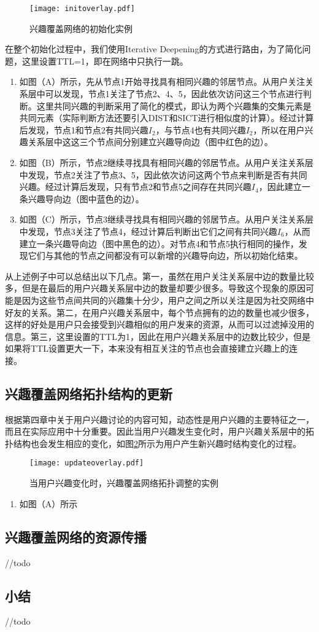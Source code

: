 \begin{figure}[!ht]
\centering
\texttt{[image: initoverlay.pdf]}
\caption{兴趣覆盖网络的初始化实例}
\label{fig:initoverlay}
\end{figure}

在整个初始化过程中，我们使用Iterative Deepening的方式进行路由，为了简化问题，这里设置TTL=1，即在网络中只执行一跳。
\begin{enumerate}
  \item 如图（A）所示，先从节点1开始寻找具有相同兴趣的邻居节点。从用户关注关系层中可以发现，节点1关注了节点2、4、5，因此依次访问这三个节点进行判断。这里共同兴趣的判断采用了简化的模式，即认为两个兴趣集的交集元素是共同元素（实际判断方法还要引入DIST和SICT进行相似度的计算）。经过计算后发现，节点1和节点2有共同兴趣$I_2$，与节点4也有共同兴趣$I_2$，所以在用户兴趣关系层中这这三个节点间分别建立兴趣导向边（图中红色的边）。
  \item 如图（B）所示，节点2继续寻找具有相同兴趣的邻居节点。从用户关注关系层中发现，节点2关注了节点3、5，因此依次访问这两个节点来判断是否有共同兴趣。经过计算后发现，只有节点2和节点5之间存在共同兴趣$I_4$，因此建立一条兴趣导向边（图中蓝色的边）。
  \item 如图（C）所示，节点3继续寻找具有相同兴趣的邻居节点。从用户关注关系层中发现，节点3关注了节点4，经过计算后判断出它们之间有共同兴趣$I_6$，从而建立一条兴趣导向边（图中黑色的边）。对节点4和节点5执行相同的操作，发现它们与其他的节点之间都没有可以新增的兴趣导向边，所以初始化结束。
\end{enumerate}

从上述例子中可以总结出以下几点。第一，虽然在用户关注关系层中边的数量比较多，但是在最后的用户兴趣关系层中边的数量却要少很多。导致这个现象的原因可能是因为这些节点间共同的兴趣集十分少，用户之间之所以关注是因为社交网络中好友的关系。第二，在用户兴趣关系层中，每个节点拥有的边的数量也减少很多，这样的好处是用户只会接受到兴趣相似的用户发来的资源，从而可以过滤掉没用的信息。第三，这里设置的TTL为1，因此在用户兴趣关系层中的边数比较少，但是如果将TTL设置更大一下，本来没有相互关注的节点也会直接建立兴趣上的连接。

\subsection{兴趣覆盖网络拓扑结构的更新}
根据第四章中关于用户兴趣讨论的内容可知，动态性是用户兴趣的主要特征之一，而且在实际应用中十分重要。因此当用户兴趣发生变化时，用户兴趣关系层中的拓扑结构也会发生相应的变化，如图\ref{fig:updateoverlay}所示为用户产生新兴趣时结构变化的过程。

\begin{figure}[!ht]
\centering
\texttt{[image: updateoverlay.pdf]}
\caption{当用户兴趣变化时，兴趣覆盖网络拓扑调整的实例}
\label{fig:updateoverlay}
\end{figure}

\begin{enumerate}
  \item 如图（A）所示
\end{enumerate}

\subsection{兴趣覆盖网络的资源传播}
//todo

\subsection{小结}
//todo

